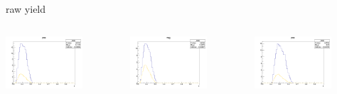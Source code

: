\begin{frame}{raw yield}
\begin{columns}
\begin{column}[T]{0.25\textwidth}
\includegraphics[width = 0.7\textwidth]{results/yield/statistics/yield_x_Q2_z_0.50_5.000_0.40_pos.png}
\end{column}
\begin{column}[T]{0.25\textwidth}
\includegraphics[width = 0.7\textwidth]{results/yield/statistics/yield_x_Q2_z_0.50_5.000_0.40_neg.png}
\end{column}
\begin{column}[T]{0.25\textwidth}
\includegraphics[width = 0.7\textwidth]{results/yield/statistics/yield_x_Q2_z_0.50_5.000_0.50_pos.png}

\end{column}
\end{columns}
\end{frame}
